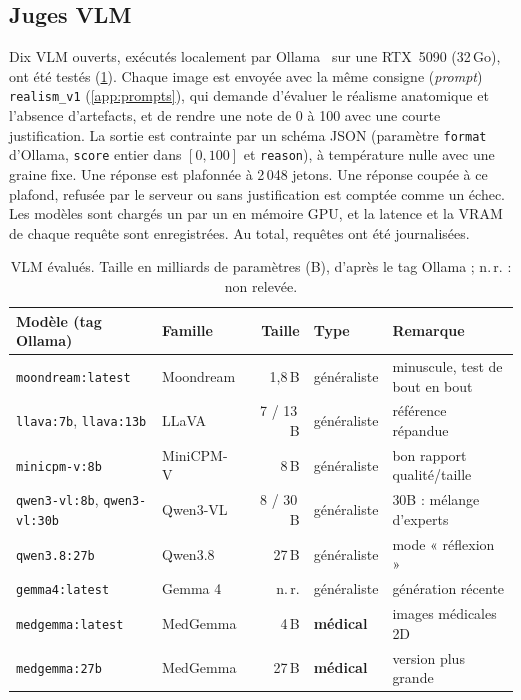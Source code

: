 \documentclass[11pt,a4paper]{article}
\begin{document}
\subsection{Juges VLM}
\label{sec:juges}
Dix VLM ouverts, exécutés localement par Ollama~\cite{ollama} sur une RTX~5090 (32\,Go), ont été testés (\cref{tab:modeles}). Chaque image est envoyée avec la même consigne (\emph{prompt}) \texttt{realism\_v1} (\cref{app:prompts}), qui demande d'évaluer le réalisme anatomique et l'absence d'artefacts, et de rendre une note de 0 à 100 avec une courte justification. La sortie est contrainte par un schéma JSON (paramètre \texttt{format} d'Ollama, \texttt{score} entier dans $[0,100]$ et \texttt{reason}), à température nulle avec une graine fixe. Une réponse est plafonnée à 2\,048 jetons. Une réponse coupée à ce plafond, refusée par le serveur ou sans justification est comptée comme un échec. Les modèles sont chargés un par un en mémoire GPU, et la latence et la VRAM de chaque requête sont enregistrées. Au total, \nJudgements{} requêtes ont été journalisées.

\begin{table}[t]
\centering\footnotesize
\caption{VLM évalués. Taille en milliards de paramètres (B), d'après le tag Ollama ; n.\,r. : non relevée.}
\label{tab:modeles}
\begin{tabular}{llrll}
\toprule
Modèle (tag Ollama) & Famille & Taille & Type & Remarque \\
\midrule
\texttt{moondream:latest} & Moondream & 1,8\,B & généraliste & minuscule, test de bout en bout \\
\texttt{llava:7b}, \texttt{llava:13b} & LLaVA~\cite{liu2023llava} & 7 / 13\,B & généraliste & référence répandue \\
\texttt{minicpm-v:8b} & MiniCPM-V~\cite{yao2024minicpmv} & 8\,B & généraliste & bon rapport qualité/taille \\
\texttt{qwen3-vl:8b}, \texttt{qwen3-vl:30b} & Qwen3-VL~\cite{qwen3vl} & 8 / 30\,B & généraliste & 30B : mélange d'experts \\
\texttt{qwen3.8:27b} & Qwen3.8 & 27\,B & généraliste & mode « réflexion » \\
\texttt{gemma4:latest} & Gemma 4 & n.\,r. & généraliste & génération récente \\
\texttt{medgemma:latest} & MedGemma~\cite{sellergren2025medgemma} & 4\,B & \textbf{médical} & images médicales 2D \\
\texttt{medgemma:27b} & MedGemma & 27\,B & \textbf{médical} & version plus grande \\
\bottomrule
\end{tabular}
\end{table}
\end{document}
